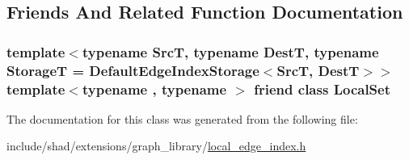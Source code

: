 \subsection{Friends And Related Function Documentation}
\hypertarget{classshad_1_1LocalEdgeIndex_a8bb3aafc5abf586d8d97ba47eb5170eb}{
\subsubsection[{Local\-Set}]{\setlength{\rightskip}{0pt plus 5cm}template$<$typename Src\-T, typename Dest\-T, typename Storage\-T = Default\-Edge\-Index\-Storage$<$\-Src\-T, Dest\-T$>$$>$ template$<$typename , typename $>$ friend class {\bf Local\-Set}\hspace{0.3cm}{\ttfamily [friend]}}}\label{classshad_1_1LocalEdgeIndex_a8bb3aafc5abf586d8d97ba47eb5170eb}


The documentation for this class was generated from the following file\-:\begin{DoxyCompactItemize}
\item 
include/shad/extensions/graph\-\_\-library/\hyperlink{local__edge__index_8h}{local\-\_\-edge\-\_\-index.\-h}\end{DoxyCompactItemize}
